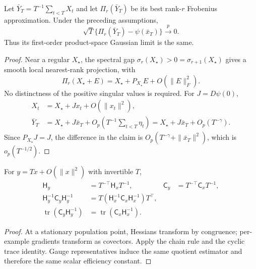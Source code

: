 \begin{corollary}
Let $\bar Y_T=T^{-1}\sum_{t<T}X_t$ and let
$\Pi_r(\bar Y_T)$ be its best rank-$r$ Frobenius approximation.
Under the preceding assumptions,
\begin{equation}
\sqrt T\{\Pi_r(\bar Y_T)-\psi(\bar x_T)\}\xrightarrow{\ p\ }0 .
\label{eq:noise-rank-average}
\end{equation}
Thus its first-order product-space Gaussian limit is the same.
\end{corollary}
\begin{proof}
Near a regular $X_\star$, the spectral gap
$\sigma_r(X_\star)>0=\sigma_{r+1}(X_\star)$ gives a smooth local
nearest-rank projection, with
\begin{equation}
\Pi_r(X_\star+E)=X_\star+P_{X_\star}E+O(\|E\|_F^2).
\end{equation}
No distinctness of the positive singular values is required.
For $J=D\psi(0)$,
\begin{align}
X_t&=X_\star+Jx_t+O(\|x_t\|^2),\\
\bar Y_T&=X_\star+J\bar x_T+
O_p\!\left(T^{-1}\sum_{t<T}\eta_t\right)
=X_\star+J\bar x_T+O_p(T^{-\gamma}).
\end{align}
Since $P_{X_\star}J=J$, the difference in the claim is
$O_p(T^{-\gamma}+\|\bar x_T\|^2)$, which is $o_p(T^{-1/2})$.
\end{proof}

\begin{proposition}
For $y=Tx+O(\|x\|^2)$ with invertible $T$,
\begin{align}
\mathsf H_y&=T^{-\top}\mathsf H_xT^{-1},&
\mathsf C_y&=T^{-\top}\mathsf C_xT^{-1},\\
\mathsf H_y^{-1}\mathsf C_y\mathsf H_y^{-1}
&=T(\mathsf H_x^{-1}\mathsf C_x\mathsf H_x^{-1})T^\top,\\
\operatorname{tr}(\mathsf C_y\mathsf H_y^{-1})
&=\operatorname{tr}(\mathsf C_x\mathsf H_x^{-1}).
\end{align}
\end{proposition}
\begin{proof}
At a stationary population point, Hessians transform by congruence;
per-example gradients transform as covectors. Apply the chain rule
and the cyclic trace identity. Gauge representatives induce the
same quotient estimator and therefore the same scalar efficiency
constant.
\end{proof}
